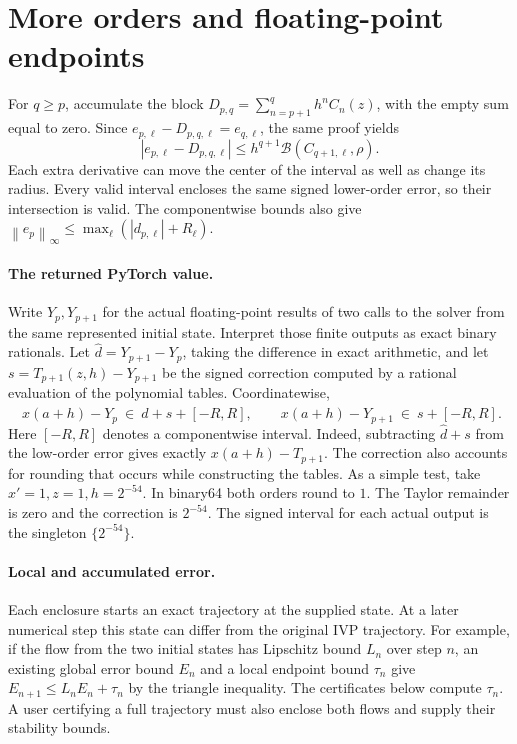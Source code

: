 \documentclass[11pt,letterpaper]{article}
\newcommand{\abs}[1]{\left|#1\right|}
\newcommand{\norm}[1]{\left\lVert#1\right\rVert}
\begin{document}
\section{More orders and floating-point endpoints}
For \(q\ge p\), accumulate the block
\(D_{p,q}=\sum_{n=p+1}^{q} h^n C_n(z)\), with the empty sum equal to zero.
Since \(e_{p,\ell}-D_{p,q,\ell}=e_{q,\ell}\), the same proof yields
\begin{equation}\label{eq:block}
 \abs{e_{p,\ell}-D_{p,q,\ell}}
   \le h^{q+1}\mathcal B(C_{q+1,\ell},\rho).
\end{equation}
Each extra derivative can move the center of the interval as well as change
its radius. Every valid interval encloses the same signed lower-order error,
so their intersection is valid. The componentwise bounds also give
\(\norm{e_p}_\infty\le\max_\ell(|d_{p,\ell}|+R_\ell)\).

\clearpage
\paragraph{The returned PyTorch value.}
Write \(Y_p,Y_{p+1}\) for the actual floating-point results of two calls to the
solver from the same represented initial state. Interpret those finite
outputs as exact binary rationals. Let
\(\widehat d=Y_{p+1}-Y_p\), taking the difference in exact arithmetic, and
let \(s=T_{p+1}(z,h)-Y_{p+1}\) be the signed correction computed by a rational
evaluation of the polynomial tables. Coordinatewise,
\begin{equation}\label{eq:rounded}
  \boxed{\quad x(a+h)-Y_p\ \in\ \widehat d+s+[-R,R],\qquad
          x(a+h)-Y_{p+1}\ \in\ s+[-R,R].\quad}
\end{equation}
Here \([-R,R]\) denotes a componentwise interval. Indeed, subtracting
\(\widehat d+s\) from the low-order error gives exactly \(x(a+h)-T_{p+1}\).
The correction also accounts for rounding that occurs while constructing the
tables. As a simple test, take \(x'=1, z=1, h=2^{-54}\). In binary64 both
orders round to \(1\). The Taylor remainder is zero and the correction is
\(2^{-54}\). The signed interval for each actual output is the singleton
\(\{2^{-54}\}\).

\paragraph{Local and accumulated error.}
Each enclosure starts an exact trajectory at the supplied state. At a later
numerical step this state can differ from the original IVP trajectory.
For example, if the flow from the two initial states has Lipschitz bound
\(L_n\) over step \(n\), an existing global error bound \(E_n\) and a local
endpoint bound \(\tau_n\) give \(E_{n+1}\le L_n E_n+\tau_n\) by the triangle
inequality. The certificates below compute \(\tau_n\). A user certifying
a full trajectory must also enclose both flows and supply their stability
bounds.
\end{document}
